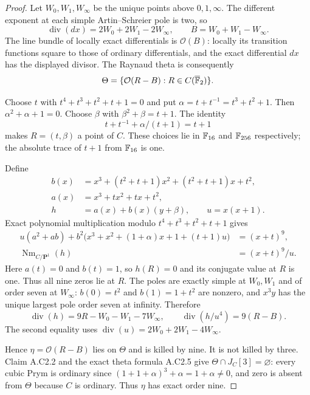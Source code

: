 \begin{proof}
Let $W_0,W_1,W_\infty$ be the unique points above $0,1,\infty$.
The different exponent at each simple Artin--Schreier pole is two,
so
\[
 \operatorname{div}(dx)=2W_0+2W_1-2W_\infty,
 \qquad B=W_0+W_1-W_\infty.
\]
The line bundle of locally exact differentials is $\mathcal O(B)$:
locally its transition functions square to those of ordinary
differentials, and the exact differential $dx$ has the displayed
divisor. The Raynaud theta is consequently
\[
                 \Theta=\{\mathcal O(R-B):R\in C(\overline{\mathbb F}_2)\}.
\]

Choose $t$ with $t^4+t^3+t^2+t+1=0$ and put
$\alpha=t+t^{-1}=t^3+t^2+1$. Then $\alpha^2+\alpha+1=0$.
Choose $\beta$ with $\beta^2+\beta=t+1$.
The identity
\[
                 t+t^{-1}+\alpha/(t+1)=t+1
\]
makes $R=(t,\beta)$ a point of $C$. These choices lie in
$\mathbb F_{16}$ and $\mathbb F_{256}$ respectively; the absolute trace of
$t+1$ from $\mathbb F_{16}$ is one.

Define
\[
\begin{aligned}
 b(x)&=x^3+(t^2+t+1)x^2+(t^2+t+1)x+t^2,\\
 a(x)&=x^3+t x^2+t x+t^2,\\
 h&=a(x)+b(x)(y+\beta),\qquad u=x(x+1).
\end{aligned}
\]
Exact polynomial multiplication modulo $t^4+t^3+t^2+t+1$ gives
\[
 \begin{aligned}
 u(a^2+ab)+b^2\bigl(x^3+x^2+(1+\alpha)x+1+(t+1)u\bigr)
                          &=(x+t)^9,\\
 \operatorname{Nm}_{C/\mathbf P^1}(h)&=(x+t)^9/u.
 \end{aligned}                                                   \tag{C2.25}
\]
Here $a(t)=0$ and $b(t)=1$, so $h(R)=0$ and its conjugate
value at $R$ is one. Thus all nine zeros lie at $R$.
The poles are exactly simple at $W_0,W_1$ and of order seven
at $W_\infty$: $b(0)=t^2$ and $b(1)=1+t^2$ are nonzero,
and $x^3y$ has the unique largest pole order seven at infinity.
Therefore
\[
 \operatorname{div}(h)=9R-W_0-W_1-7W_\infty,
 \qquad \operatorname{div}(h/u^4)=9(R-B).                         \tag{C2.26}
\]
The second equality uses
$\operatorname{div}(u)=2W_0+2W_1-4W_\infty$.

Hence $\eta=\mathcal O(R-B)$ lies on $\Theta$ and is killed
by nine. It is not killed by three. Claim A.C2.2 and the exact
theta formula A.C2.5 give $\Theta\cap J_C[3]=\varnothing$:
every cubic Prym is ordinary since
$(1+1+\alpha)^3+\alpha=1+\alpha\ne0$, and zero is absent
from $\Theta$ because $C$ is ordinary. Thus $\eta$ has exact
order nine.


\end{proof}
